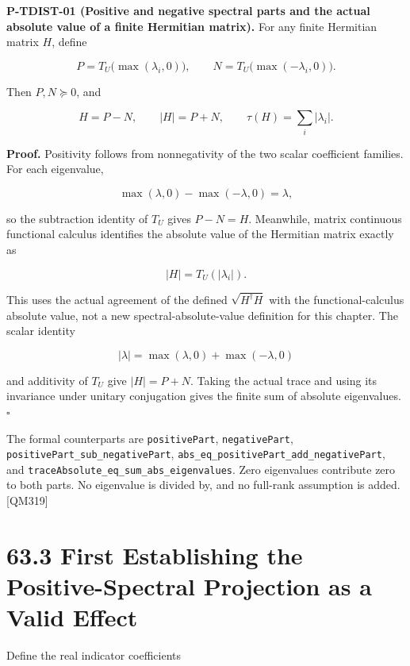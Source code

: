 \documentclass[
  11pt,
  oneside]{book}
\begin{document}
\label{p-tdist-01}{}

\textbf{P-TDIST-01 (Positive and negative spectral parts and the actual
absolute value of a finite Hermitian matrix).} For any finite Hermitian
matrix \(H\), define

\[
P=T_U\bigl(\max(\lambda_i,0)\bigr),
\qquad
N=T_U\bigl(\max(-\lambda_i,0)\bigr).
\]

Then \(P,N\succeq0\), and

\[
H=P-N,\qquad |H|=P+N,
\qquad
\tau(H)=\sum_i|\lambda_i|.
\]

\textbf{Proof.} Positivity follows from nonnegativity of the two scalar
coefficient families. For each eigenvalue,

\[
\max(\lambda,0)-\max(-\lambda,0)=\lambda,
\]

so the subtraction identity of \(T_U\) gives \(P-N=H\). Meanwhile,
matrix continuous functional calculus identifies the absolute value of
the Hermitian matrix exactly as

\[
|H|=T_U(|\lambda_i|).
\]

This uses the actual agreement of the defined \(\sqrt{H^\dagger H}\)
with the functional-calculus absolute value, not a new
spectral-absolute-value definition for this chapter. The scalar identity

\[
|\lambda|=\max(\lambda,0)+\max(-\lambda,0)
\]

and additivity of \(T_U\) give \(|H|=P+N\). Taking the actual trace and
using its invariance under unitary conjugation gives the finite sum of
absolute eigenvalues. \(\square\)

The formal counterparts are \texttt{positive\allowbreak Part},
\texttt{negative\allowbreak Part}, \texttt{positive\allowbreak Part\_\allowbreak sub\_\allowbreak negative\allowbreak Part},
\texttt{abs\_\allowbreak eq\_\allowbreak positive\allowbreak Part\_\allowbreak add\_\allowbreak negative\allowbreak Part}, and
\texttt{trace\allowbreak Absolute\_\allowbreak eq\_\allowbreak sum\_\allowbreak abs\_\allowbreak eigenvalues}. Zero eigenvalues
contribute zero to both parts. No eigenvalue is divided by, and no
full-rank assumption is added. {[}QM319{]}

\section{63.3 First Establishing the Positive-Spectral Projection as a
Valid Effect}

Define the real indicator coefficients
\end{document}

